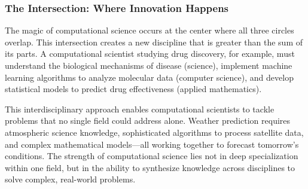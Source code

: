 \subsubsection{The Intersection: Where Innovation Happens}

The magic of computational science occurs at the center where all three circles overlap. This intersection creates a new discipline that is greater than the sum of its parts. A computational scientist studying drug discovery, for example, must understand the biological mechanisms of disease (science), implement machine learning algorithms to analyze molecular data (computer science), and develop statistical models to predict drug effectiveness (applied mathematics).

This interdisciplinary approach enables computational scientists to tackle problems that no single field could address alone. Weather prediction requires atmospheric science knowledge, sophisticated algorithms to process satellite data, and complex mathematical models—all working together to forecast tomorrow's conditions. The strength of computational science lies not in deep specialization within one field, but in the ability to synthesize knowledge across disciplines to solve complex, real-world problems.

